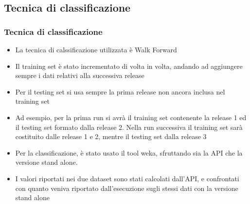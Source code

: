 \documentclass[10pt]{beamer}
\begin{document}
\begin{frame}
\section{Tecnica di classificazione}
\frametitle{Tecnica di classificazione}
\begin{itemize}
\item La tecnica di calssificazione utilizzata è Walk Forward
\item Il training set è stato incrementato di volta in volta, andando ad aggiungere sempre i dati relativi alla successiva release
\item Per il testing set si usa sempre la prima release non ancora inclusa nel training set
\item Ad esempio, per la prima run si avrà il training set contenente la release 1 ed il testing set formato dalla release 2. Nella run successiva il training set sarà costituito dalle release 1 e 2, mentre il testing set dalla release 3
\item Per la classificazione, è stato usato il tool weka, sfruttando sia la API che la versione stand alone.
\item I valori riportati nei due dataset sono stati calcolati dall'API, e confrontati con quanto veniva riportato dall'esecuzione sugli stessi dati con la versione stand alone
\end{itemize} 
\end{frame}
\end{document}
